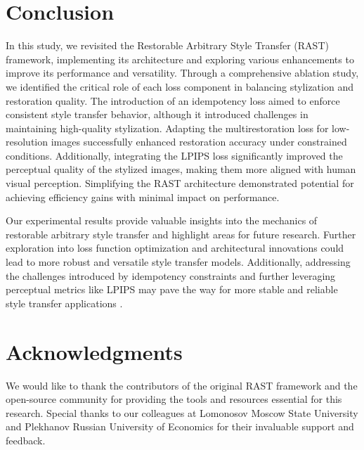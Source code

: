 \documentclass{article}
\begin{document}
\section{Conclusion}
\label{sec:conclusion}

In this study, we revisited the Restorable Arbitrary Style Transfer (RAST) framework, implementing its architecture and exploring various enhancements to improve its performance and versatility. Through a comprehensive ablation study, we identified the critical role of each loss component in balancing stylization and restoration quality. The introduction of an idempotency loss aimed to enforce consistent style transfer behavior, although it introduced challenges in maintaining high-quality stylization. Adapting the multirestoration loss for low-resolution images successfully enhanced restoration accuracy under constrained conditions. Additionally, integrating the LPIPS loss significantly improved the perceptual quality of the stylized images, making them more aligned with human visual perception. Simplifying the RAST architecture demonstrated potential for achieving efficiency gains with minimal impact on performance.

Our experimental results provide valuable insights into the mechanics of restorable arbitrary style transfer and highlight areas for future research. Further exploration into loss function optimization and architectural innovations could lead to more robust and versatile style transfer models. Additionally, addressing the challenges introduced by idempotency constraints and further leveraging perceptual metrics like LPIPS may pave the way for more stable and reliable style transfer applications \cite{Ma2023RAST, Zhang2018LPIPS, Wang2019}.

\section*{Acknowledgments}
We would like to thank the contributors of the original RAST framework and the open-source community for providing the tools and resources essential for this research. Special thanks to our colleagues at Lomonosov Moscow State University and Plekhanov Russian University of Economics for their invaluable support and feedback.


\end{document}
